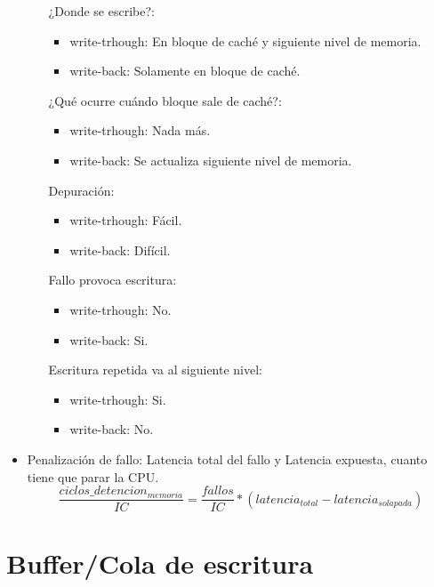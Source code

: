 \documentclass[12pt, twoside, openright]{report} %
\begin{document}
\begin{itemize}
\begin{itemize}
\begin{itemize}
        \end{itemize}
        ¿Donde se escribe?:
        \begin{itemize}
          \item write-trhough: En bloque de caché y siguiente nivel de memoria.
          \item write-back: Solamente en bloque de caché.
        \end{itemize}
        ¿Qué ocurre cuándo bloque sale de caché?:
        \begin{itemize}
          \item write-trhough: Nada más.
          \item write-back: Se actualiza siguiente nivel de memoria.
        \end{itemize}
        Depuración:
        \begin{itemize}
          \item write-trhough: Fácil.
          \item write-back: Difícil.
        \end{itemize}
        Fallo provoca escritura:
        \begin{itemize}
          \item write-trhough: No.
          \item write-back: Si.
        \end{itemize}
        Escritura repetida va al siguiente nivel:
        \begin{itemize}
          \item write-trhough: Si.
          \item write-back: No.
        \end{itemize}
      \end{itemize}
    \item
      Penalización de fallo: Latencia total del fallo y Latencia
      expuesta, cuanto tiene que parar la CPU.
      $$\frac {ciclos\_detencion_{memoria}} {IC}= \frac {fallos} {IC}*(latencia_{total}-latencia_{solapada})$$
    \end{itemize}
  \section{Buffer/Cola de escritura}
\end{document}
